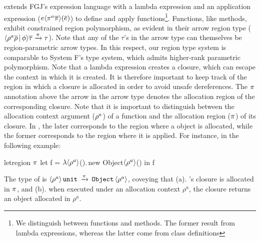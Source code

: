\FB extends FGJ's expression language with a lambda expression and an
application expression ($e\langle \pi^a\overline{\pi} \rangle(\overline{e})$) to define
and apply functions\footnote{We distinguish between functions and
methods. The former result from lambda expressions, whereas the latter
come from class definitions}. Functions, like methods, exhibit
constrained region polymorphism, as evident in their arrow region type
($\langle \rho^a\overline{\rho} \,|\, \phi \rangle\overline{\tau} \xrightarrow{\pi}
\tau$). Note that any of the $\tau$'s in the arrow type can themselves
be region-parametric arrow types. In this respect, our region type
system is comparable to System F's type system, which admits
higher-rank parametric polymorphism. 
Note that a lambda expression creates a closure, which can escape the
context in which it is created. It is therefore important to keep track of
the region in which a closure is allocated in order to avoid unsafe
dereferences. The $\pi$ annotation above the arrow in the arrow
type denotes the allocation region of the corresponding closure. Note
that it is important to distinguish between the allocation context
argument ($\rho^a$) of a function and the allocation region
($\pi$) of its closure. In \name, the later corresponds to the region where
a  object is allocated, while the former corresponds to the
region where it is applied.  For instance, in the following example:
\begin{codejava}
letregion $\pi$ {
  let f = $\lambda{\langle \rho^a \rangle}$().$\,$new Object$\langle \rho^a \rangle$() 
  in f
}
\end{codejava}
The type of  is $\langle \rho^a \rangle\,{\tt unit}\, \xrightarrow{\pi}
\,{\tt Object}\,\langle \rho^a \rangle$, coveying that (a). 's closure is allocated
in $\pi$, and (b). when executed under an allocation context
$\rho^a$, the closure returns an object allocated in $\rho^a$.

